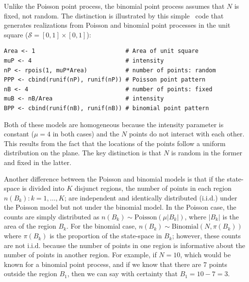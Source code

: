 Unlike the Poisson point process, the
binomial point process assumes that $N$ is fixed, not random.
The distinction is illustrated by this simple \R~code that generates
realizations from Poisson and binomial point processes in the unit
square ($\mathcal{S} = [0,1]\times[0,1]$):

\begin{small}
\begin{verbatim}
Area <- 1                          # Area of unit square
muP <- 4                           # intensity
nP <- rpois(1, muP*Area)           # number of points: random
PPP <- cbind(runif(nP), runif(nP)) # Poisson point pattern
nB <- 4                            # number of points: fixed
muB <- nB/Area                     # intensity
BPP <- cbind(runif(nB), runif(nB)) # binomial point pattern
\end{verbatim}
\end{small}

{\flushleft Both of these models are homogeneous because the intensity parameter
is constant ($\mu=4$ in both cases) and the $N$ points do not interact
with each other. This results from the fact that the locations of the
points follow a uniform distribution on the plane. The key distinction
is that $N$ is random in the former and fixed in the latter.}

Another difference between the Poisson and binomial models is that if the
state-space is divided into $K$ disjunct regions, the number of points in each
region $n(B_k): k=1,\dots,K$; are independent and identically
distributed (i.i.d.) under the Poisson model but not under the
binomial model. In the Poisson case,
the counts are simply distributed as $n(B_k) \sim
\text{Poisson}(\mu|B_k|)$, where $|B_k|$ is the area of the region
$B_k$. For the binomial case, $n(B_k) \sim
\text{Binomial}(N, \pi(B_k))$ where $\pi(B_k)$ is the proportion of
the state-space in $B_k$; however, these counts are not
i.i.d. because the number of points in one region is informative
about the number of points in another region. For example, if
$N=10$, which would be known for a binomial point process, and if we
know that there are 7 points outside the region $B_1$,
then we can say with certainty that $B_1 = 10 - 7 = 3$.

